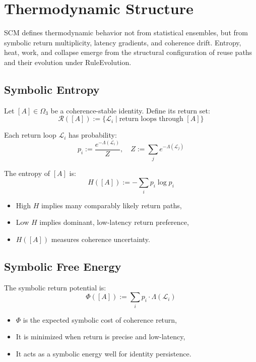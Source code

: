 \chapter{Thermodynamic Structure} \label{chapter-thermodynamics}

SCM defines thermodynamic behavior not from statistical ensembles, but from symbolic return multiplicity, latency gradients, and coherence drift. Entropy, heat, work, and collapse emerge from the structural configuration of reuse paths and their evolution under RuleEvolution.

\section{Symbolic Entropy} \label{sec:symbolic-entropy}

Let $[A] \in \Omega_3$ be a coherence-stable identity. Define its return set:
\[
\mathcal{R}([A]) := \{ \mathcal{L}_i \mid \text{return loops through } [A] \}
\]

Each return loop $\mathcal{L}_i$ has probability:
\[
p_i := \frac{e^{-\Lambda(\mathcal{L}_i)}}{Z},\quad Z := \sum_j e^{-\Lambda(\mathcal{L}_j)}
\]

\begin{definition}
The entropy of $[A]$ is:
\[
H([A]) := -\sum_{i} p_i \log p_i
\]
\end{definition}

\begin{itemize}
  \item High $H$ implies many comparably likely return paths,
  \item Low $H$ implies dominant, low-latency return preference,
  \item $H([A])$ measures coherence uncertainty.
\end{itemize}

\section{Symbolic Free Energy} \label{sec:free-energy}

\begin{definition}
The symbolic return potential is:
\[
\Phi([A]) := \sum_i p_i \cdot \Lambda(\mathcal{L}_i)
\]
\end{definition}

\begin{itemize}
  \item $\Phi$ is the expected symbolic cost of coherence return,
  \item It is minimized when return is precise and low-latency,
  \item It acts as a symbolic energy well for identity persistence.
\end{itemize}

